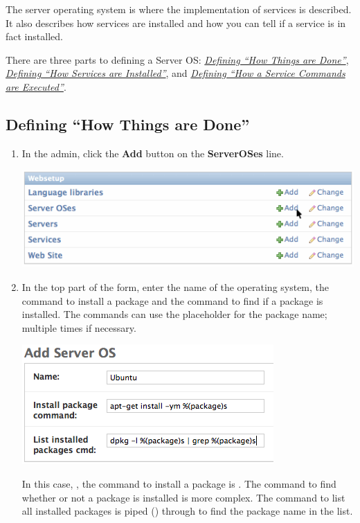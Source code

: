 \documentclass[letterpaper,10pt,english]{manual}
\begin{document}
The server operating system is where the implementation of services is described. It also describes how services are installed and how you can tell if a service is in fact installed.

There are three parts to defining a Server OS: \hyperlink{howthingsaredone}{\emph{Defining ``How Things are Done''}}, \hyperlink{howservicesareinstalled}{\emph{Defining ``How Services are Installed''}}, and \hyperlink{howaservicecommandsareexecuted}{\emph{Defining ``How a Service Commands are Executed''}}.


\hypertarget{howthingsaredone}{}\subsection{Defining ``How Things are Done''}
\begin{enumerate}
\item {} 
In the admin, click the \textbf{Add} button on the \textbf{ServerOSes} line.

\includegraphics{add_serveros.png}

\item {} 
In the top part of the form, enter the name of the operating system, the command to install a package and the command to find if a package is installed. The commands can use the placeholder  for the package name; multiple times if necessary.

\includegraphics{add_serveros_form.png}

In this case, , the command to install a package is . The command to find whether or not a package is installed is more complex. The command to list all installed packages  is piped (\code{\textbar{}}) through  to find the package name in the list.

\end{enumerate}
\hypertarget{howservicesareinstalled}{}
\end{document}
